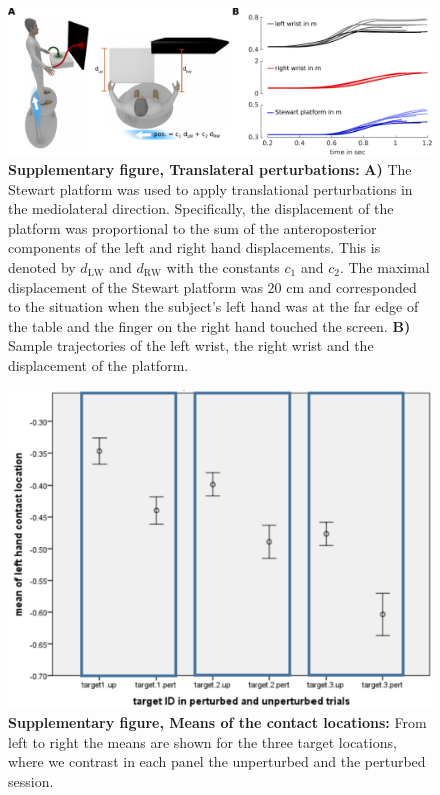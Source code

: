 \begin{figure}
\centering
\includegraphics[width=\textwidth]{Elmar/picsSupp/SubFigStewartPert}
 \caption{\textbf{Supplementary figure, Translateral perturbations:} 
 \textbf{A)} The Stewart platform was used to apply translational perturbations in the mediolateral direction. Specifically, the displacement of the platform was proportional to the sum of the anteroposterior components of the left and right hand displacements. This is denoted by $d_{\textrm{LW}}$ and $d_{\textrm{RW}}$ with the constants $c_1$ and $c_2$. The maximal displacement of the Stewart platform was $20$ cm and corresponded to the situation when the subject's left hand was at the far edge of the table and the finger on the right hand touched the screen. \textbf{B)} Sample trajectories of the left wrist, the right wrist and the displacement of the platform. 
 }
\label{fig:SubFigStewartPert}
\end{figure}


\begin{figure}
\centering
\includegraphics[width=.7\textwidth]{Elmar/picsSupp/SubFigANOVAContactsUPvsPNoTitle}
 \caption{\textbf{Supplementary figure, Means of the contact locations:} 
 From left to right the means are shown for the three target locations, where we contrast in each panel the unperturbed and the perturbed session.  
 }
\label{fig:SubFigANOVAContacts}
\end{figure}



